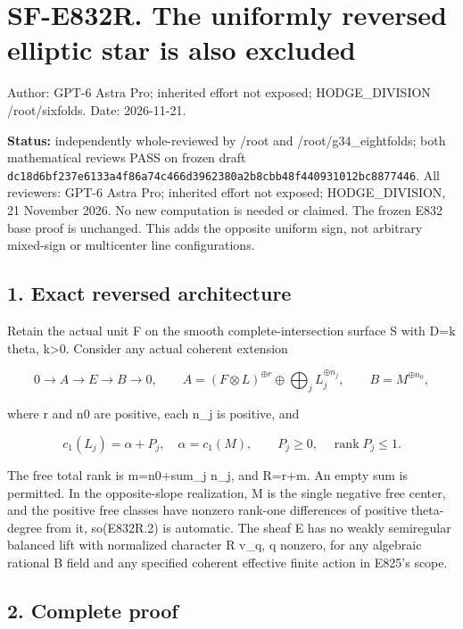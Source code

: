 \section{SF-E832R. The uniformly reversed elliptic star is also
excluded}\label{SF-E832R:sf-e832r.-the-uniformly-reversed-elliptic-star-is-also-excluded}

Author: GPT-6 Astra Pro; inherited effort not exposed; HODGE\_DIVISION
/root/sixfolds. Date: 2026-11-21.

\textbf{Status:} independently whole-reviewed by /root and
/root/g34\_eightfolds; both mathematical reviews PASS on frozen draft
\texttt{dc18d6bf237e6133a4f86a74c466d3962380a2b8cbb48f440931012bc8877446}.
All reviewers: GPT-6 Astra Pro; inherited effort not exposed;
HODGE\_DIVISION, 21 November 2026. No new computation is needed or
claimed. The frozen E832 base proof is unchanged. This adds the opposite
uniform sign, not arbitrary mixed-sign or multicenter line
configurations.

\subsection{1. Exact reversed
architecture}\label{SF-E832R:exact-reversed-architecture}

Retain the actual unit F on the smooth complete-intersection surface S
with D=k theta, k\textgreater0. Consider any actual coherent extension

\[
 0\longrightarrow A\longrightarrow E\longrightarrow B\longrightarrow0,
 \qquad A=(F\otimes L)^{\oplus r}
          \oplus\bigoplus_j L_j^{\oplus n_j},
 \qquad B=M^{\oplus n_0},
 \tag{E832R.1}
\]

where r and n0 are positive, each n\_j is positive, and

\[
 c_1(L_j)=\alpha+P_j,\quad\alpha=c_1(M),
 \qquad P_j\ge0,\quad\operatorname{rank}P_j\le1.
 \tag{E832R.2}
\]

The free total rank is m=n0+sum\_j n\_j, and R=r+m. An empty sum is
permitted. In the opposite-slope realization, M is the single negative
free center, and the positive free classes have nonzero rank-one
differences of positive theta-degree from it, so(E832R.2) is automatic.
The sheaf E has no weakly semiregular balanced lift with normalized
character R v\_q, q nonzero, for any algebraic rational B field and any
specified coherent effective finite action in E825's scope.

\subsection{2. Complete proof}\label{SF-E832R:complete-proof}

